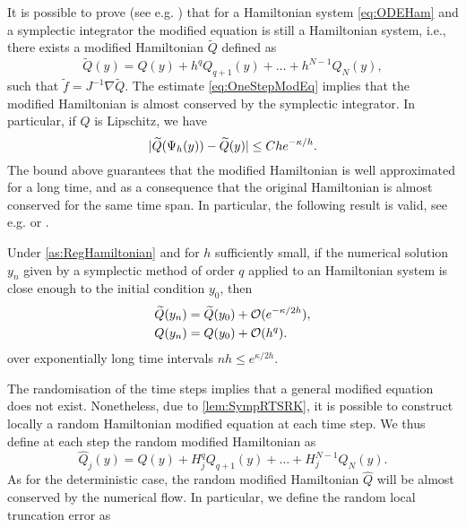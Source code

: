 \documentclass[10pt]{article}
\begin{document}
It is possible to prove (see e.g. \cite[Section IX.8]{HLW06}) that for a Hamiltonian system \eqref{eq:ODEHam} and a symplectic integrator the modified equation is still a Hamiltonian system, i.e., there exists a modified Hamiltonian $\tilde Q$ defined as
\begin{equation}\label{eq:ModifiedHamiltonianTrunc}
\tilde Q(y) = Q(y) + h^q Q_{q+1}(y) + \ldots + h^{N-1} Q_N(y),
\end{equation}
such that $\tilde f = J^{-1} \nabla \tilde Q$. The estimate \eqref{eq:OneStepModEq} implies that the modified Hamiltonian is almost conserved by the symplectic integrator. In particular, if $Q$ is Lipschitz, we have
\begin{equation}\label{eq:LocalErrorHamiltonianDet}
	\lvert\widetilde Q(\Psi_h(y)) - \widetilde Q(y)\rvert \leq Che^{-\kappa/h}.
\end{equation}
The bound above guarantees that the modified Hamiltonian is well approximated for a long time, and as a consequence that the original Hamiltonian is almost conserved for the same time span. In particular, the following result is valid, see e.g. \cite[Theorem IX.8.1.]{HLW06} or \cite{BeG94}.
\begin{theorem}\label{thm:DetHamiltonian} Under \cref{as:RegHamiltonian} and for $h$ sufficiently small, if the numerical solution $y_n$ given by a symplectic method of order $q$ applied to an Hamiltonian system is close enough to the initial condition $y_0$, then 
	\begin{equation}
	\begin{aligned}
	\widetilde Q(y_n) &= \widetilde Q(y_0) + \mathcal{O}(e^{-\kappa / 2h}), \\
	Q(y_n) &= Q(y_0) + \mathcal{O}(h^q).
	\end{aligned}
	\end{equation}
	over exponentially long time intervals $nh \leq e^{\kappa / 2h}$.
\end{theorem}
The randomisation of the time steps implies that a general modified equation does not exist. Nonetheless, due to \cref{lem:SympRTSRK}, it is possible to construct locally a random Hamiltonian modified equation at each time step. We thus define at each step the random modified Hamiltonian as
\begin{equation}\label{eq:ModifiedHamiltonianTruncRand}
\hat Q_j(y) = Q(y) + H_j^q Q_{q+1}(y) + \ldots + H_j^{N-1} Q_N(y).
\end{equation}
As for the deterministic case, the random modified Hamiltonian $\hat Q$ will be almost conserved by the numerical flow. In particular, we define the random local truncation error as
\end{document}
